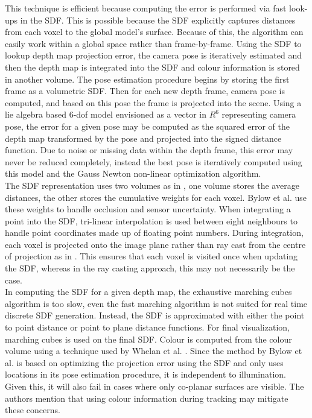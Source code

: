 This technique is efficient because computing the error is performed via fast look-ups in the SDF. This is possible because the SDF explicitly captures distances from each voxel to the global model's surface. Because of this, the algorithm can easily work within a global space rather than frame-by-frame. Using the SDF to lookup depth map projection error, the camera pose is iteratively estimated and then the depth map is integrated into the SDF and colour information is stored in another volume. The pose estimation procedure begins by storing the first frame as a volumetric SDF. Then for each new depth frame, camera pose is computed, and based on this pose the frame is projected into the scene. Using a lie algebra based 6-dof model \cite{Ma12Invitation} envisioned as a vector in $R^6$ representing camera pose, the error for a given pose may be computed as the squared error of the depth map transformed by the pose and projected into the signed distance function. Due to noise or missing data within the depth frame, this error may never be reduced completely, instead the best pose is iteratively computed using this model and the Gauss Newton non-linear optimization algorithm. \\

The SDF representation uses two volumes as in \cite{Curless96Volumetric}, one volume stores the average distances, the other stores the cumulative weights for each voxel. Bylow et al. use these weights to handle occlusion and sensor uncertainty. When integrating a point into the SDF, tri-linear interpolation is used between eight neighbours to handle point coordinates made up of floating point numbers. During integration, each voxel is projected onto the image plane rather than ray cast from the centre of projection as in \cite{Newcombe11Kinectfusion}. This ensures that each voxel is visited once when updating the SDF, whereas in the ray casting approach, this may not necessarily be the case. \\

In computing the SDF for a given depth map, the exhaustive marching cubes algorithm is too slow, even the fast marching algorithm \cite{Baerentzen01Implementation} is not suited for real time discrete SDF generation. Instead, the SDF is approximated with either the point to point distance or point to plane distance functions. For final visualization, marching cubes is used \cite{Lorensen87Marching} on the final SDF. Colour is computed from the colour volume using a technique used by Whelan et al. \cite{Whelan13Robust}. Since the method by Bylow et al. is based on optimizing the projection error using the SDF and only uses locations in its pose estimation procedure, it is independent to illumination. Given this, it will also fail in cases where only co-planar surfaces are visible. The authors mention that using colour information during tracking \cite{Kerl13Robust} may mitigate these concerns.

